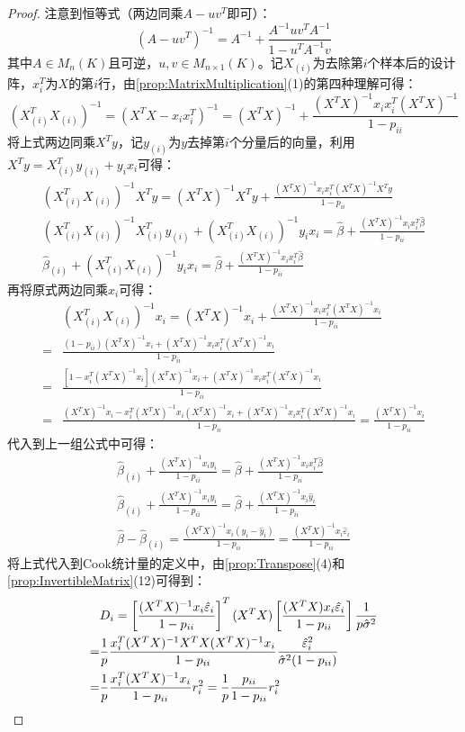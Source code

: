 \begin{proof}
	注意到恒等式（两边同乘$A-uv^T$即可）：
	\begin{equation*}
		(A-uv^T)^{-1}=A^{-1}+\frac{A^{-1}uv^TA^{-1}}{1-u^TA^{-1}v}
	\end{equation*}
	其中$A\in M_{n}(K)$且可逆，$u,v\in M_{n\times 1}(K)$。记$X_{(i)}$为去除第$i$个样本后的设计阵，$x_i^T$为$X$的第$i$行，由\cref{prop:MatrixMultiplication}(1)的第四种理解可得：
	\begin{equation*}
		(X_{(i)}^TX_{(i)})^{-1}=(X^TX-x_ix_i^T)^{-1}=(X^TX)^{-1}+\frac{(X^TX)^{-1}x_ix_i^T(X^TX)^{-1}}{1-p_{ii}}
	\end{equation*}
	将上式两边同乘$X^Ty$，记$y_{(i)}$为$y$去掉第$i$个分量后的向量，利用$X^Ty=X_{(i)}^Ty_{(i)}+y_ix_i$可得：
	\begin{gather*}
		(X_{(i)}^TX_{(i)})^{-1}X^Ty=(X^TX)^{-1}X^Ty+\frac{(X^TX)^{-1}x_ix_i^T(X^TX)^{-1}X^Ty}{1-p_{ii}} \\
		(X_{(i)}^TX_{(i)})^{-1}X_{(i)}^Ty_{(i)}+(X_{(i)}^TX_{(i)})^{-1}y_ix_i=\hat{\beta}+\frac{(X^TX)^{-1}x_ix_i^T\hat{\beta}}{1-p_{ii}} \\
		\hat{\beta}_{(i)}+(X_{(i)}^TX_{(i)})^{-1}y_ix_i=\hat{\beta}+\frac{(X^TX)^{-1}x_ix_i^T\hat{\beta}}{1-p_{ii}}
	\end{gather*}
	再将原式两边同乘$x_i$可得：
	\begin{align*}
		&(X_{(i)}^TX_{(i)})^{-1}x_i=(X^TX)^{-1}x_i+\frac{(X^TX)^{-1}x_ix_i^T(X^TX)^{-1}x_i}{1-p_{ii}} \\
		=&\frac{(1-p_{ii})(X^TX)^{-1}x_i+(X^TX)^{-1}x_ix_i^T(X^TX)^{-1}x_i}{1-p_{ii}} \\
		=&\frac{[1-x_i^T(X^TX)^{-1}x_i](X^TX)^{-1}x_i+(X^TX)^{-1}x_ix_i^T(X^TX)^{-1}x_i}{1-p_{ii}} \\
		=&\frac{(X^TX)^{-1}x_i-x_i^T(X^TX)^{-1}x_i(X^TX)^{-1}x_i+(X^TX)^{-1}x_ix_i^T(X^TX)^{-1}x_i}{1-p_{ii}}=\frac{(X^TX)^{-1}x_i}{1-p_{ii}}
	\end{align*}
	代入到上一组公式中可得：
	\begin{gather*}
		\hat{\beta}_{(i)}+\frac{(X^TX)^{-1}x_iy_i}{1-p_{ii}}=\hat{\beta}+\frac{(X^TX)^{-1}x_ix_i^T\hat{\beta}}{1-p_{ii}} \\
		\hat{\beta}_{(i)}+\frac{(X^TX)^{-1}x_iy_i}{1-p_{ii}}=\hat{\beta}+\frac{(X^TX)^{-1}x_i\hat{y}_i}{1-p_{ii}} \\
		\hat{\beta}-\hat{\beta}_{(i)}=\frac{(X^TX)^{-1}x_i(y_i-\hat{y}_i)}{1-p_{ii}}=\frac{(X^TX)^{-1}x_i\hat{\varepsilon}_i}{1-p_{ii}} 
	\end{gather*}
	将上式代入到Cook统计量的定义中，由\cref{prop:Transpose}(4)和\cref{prop:InvertibleMatrix}(12)可得到：
	\begin{align*}
		&D_i=\left[\frac{(X^TX)^{-1}x_i\hat{\varepsilon}_i}{1-p_{ii}}\right]^T(X^TX)\left[\frac{(X^TX)x_i\hat{\varepsilon}_i}{1-p_{ii}}\right]\frac{1}{p\hat{\sigma}^2} \\
		=&\frac{1}{p}\frac{x_i^T(X^TX)^{-1}X^TX(X^TX)^{-1}x_i}{1-p_{ii}}\frac{\hat{\varepsilon}_i^2}{\hat{\sigma}^2(1-p_{ii})} \\
		=&\frac{1}{p}\frac{x_i^T(X^TX)^{-1}x_i}{1-p_{ii}}r_i^2=\frac{1}{p}\frac{p_{ii}}{1-p_{ii}}r_i^2\qedhere
	\end{align*}
\end{proof}
